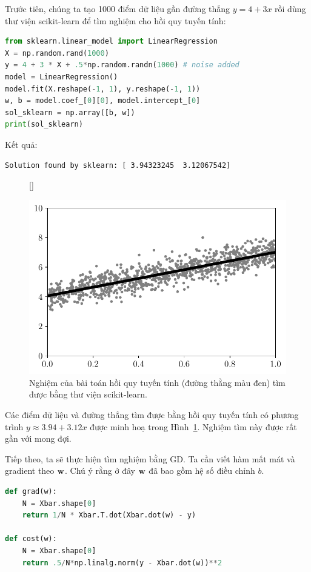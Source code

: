 Trước tiên, chúng ta tạo 1000 điểm dữ liệu gần đường thẳng $y = 4 + 3x$ rồi dùng thư viện scikit-learn để tìm nghiệm cho hồi quy tuyến tính:

\begin{lstlisting}[language=Python]
from sklearn.linear_model import LinearRegression
X = np.random.rand(1000)
y = 4 + 3 * X + .5*np.random.randn(1000) # noise added
model = LinearRegression()
model.fit(X.reshape(-1, 1), y.reshape(-1, 1))
w, b = model.coef_[0][0], model.intercept_[0]
sol_sklearn = np.array([b, w])
print(sol_sklearn)
\end{lstlisting}
Kết quả:
\begin{lstlisting}
Solution found by sklearn: [ 3.94323245  3.12067542]
\end{lstlisting}


\begin{figure}[t]
[\FBwidth]
{\caption{
Nghiệm của bài toán hồi quy tuyến tính (đường thằng màu đen) tìm được bằng
thư viện scikit-learn.
}
\label{fig:7_lr_sklearn}}
{ %

\includegraphics[width=.485\textwidth]{ebookML_src/src/grad_descent/LR_data.pdf}
}
\end{figure}
Các điểm dữ liệu và đường thẳng tìm được bằng hồi quy tuyến tính có phương trình
$y \approx 3.94 + 3.12x$ được minh hoạ trong Hình~\ref{fig:7_lr_sklearn}. Nghiệm
tìm này được rất gần với mong đợi.

Tiếp theo, ta sẽ thực hiện tìm nghiệm bằng GD. Ta cần viết hàm mất mát và gradient theo $\mathbf{w}$. Chú ý rằng ở đây $\mathbf{w}$ đã bao gồm hệ số điều chỉnh $b$.

\begin{lstlisting}[language=Python]
def grad(w):
    N = Xbar.shape[0]
    return 1/N * Xbar.T.dot(Xbar.dot(w) - y)

def cost(w):
    N = Xbar.shape[0]
    return .5/N*np.linalg.norm(y - Xbar.dot(w))**2
\end{lstlisting}

